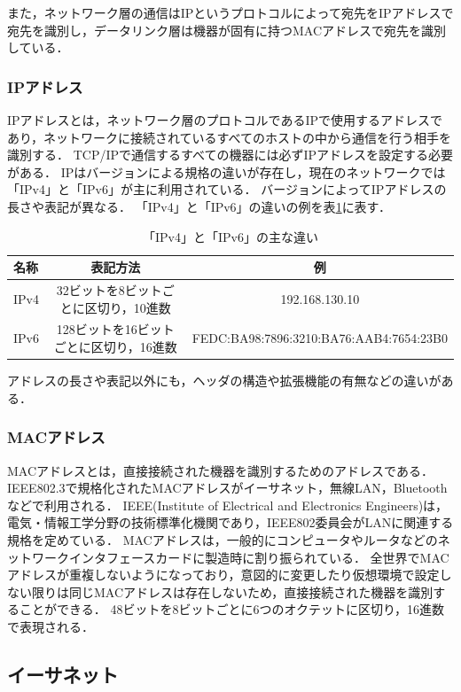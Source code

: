 \documentclass[12pt,a4j,titlepage]{ltjsarticle}
\begin{document}
また，ネットワーク層の通信はIPというプロトコルによって宛先をIPアドレスで宛先を識別し，データリンク層は機器が固有に持つMACアドレスで宛先を識別している．
\clearpage
\subsubsection{IPアドレス}
IPアドレスとは，ネットワーク層のプロトコルであるIPで使用するアドレスであり，ネットワークに接続されているすべてのホストの中から通信を行う相手を識別する．
TCP/IPで通信するすべての機器には必ずIPアドレスを設定する必要がある．
IPはバージョンによる規格の違いが存在し，現在のネットワークでは「IPv4」と「IPv6」が主に利用されている．
バージョンによってIPアドレスの長さや表記が異なる．
「IPv4」と「IPv6」の違いの例を表\ref{table:ipv}に表す．\\

\begin{table}[hbtp]
  \caption{「IPv4」と「IPv6」の主な違い}
  \label{table:ipv}
  \centering
  \begin{tabular}{|l|c|c|}
    \hline
    名称  & 表記方法  &  例  \\
    \hline
    \hline 
    IPv4  & 32ビットを8ビットごとに区切り，10進数  & 192.168.130.10 \\
    \hline
    IPv6  & 128ビットを16ビットごとに区切り，16進数 & FEDC:BA98:7896:3210:BA76:AAB4:7654:23B0 \\
    \hline
  \end{tabular}
\end{table}
アドレスの長さや表記以外にも，ヘッダの構造や拡張機能の有無などの違いがある．
\subsubsection{MACアドレス}
MACアドレスとは，直接接続された機器を識別するためのアドレスである．IEEE802.3で規格化されたMACアドレスがイーサネット，無線LAN，Bluetoothなどで利用される．
IEEE(Institute of Electrical and Electronics Engineers)は，電気・情報工学分野の技術標準化機関であり，IEEE802委員会がLANに関連する規格を定めている．
MACアドレスは，一般的にコンピュータやルータなどのネットワークインタフェースカードに製造時に割り振られている．
全世界でMACアドレスが重複しないようになっており，意図的に変更したり仮想環境で設定しない限りは同じMACアドレスは存在しないため，直接接続された機器を識別することができる．
48ビットを8ビットごとに6つのオクテットに区切り，16進数で表現される．
\clearpage

\subsection{イーサネット}
\end{document}
